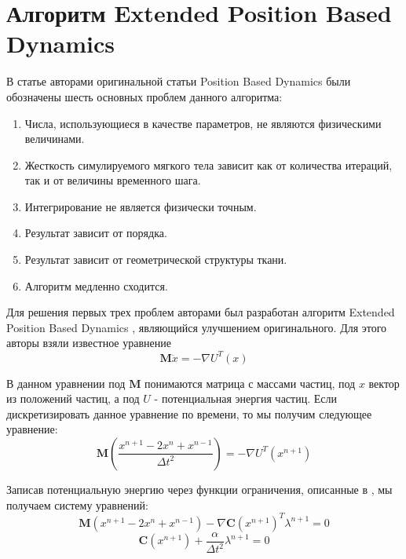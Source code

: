 \section{Алгоритм Extended Position Based Dynamics} \label{ch2:xpbd} %
	В статье \cite{muller2020detailed} авторами оригинальной статьи Position Based Dynamics были обозначены шесть основных проблем данного алгоритма:
	\begin{enumerate}[1.]
		\item Числа, использующиеся в качестве параметров, не являются физическими величинами.
		\item Жесткость симулируемого мягкого тела зависит как от количества итераций, так и от величины временного шага.
		\item Интегрирование не является физически точным.
		\item Результат зависит от порядка.
		\item Результат зависит от геометрической структуры ткани.
		\item Алгоритм медленно сходится.
	\end{enumerate}
	
	Для решения первых трех проблем авторами был разработан алгоритм Extended Position Based Dynamics \cite{xpbd}, являющийся улучшением оригинального. Для этого авторы взяли известное уравнение
	\begin{equation}
		\textbf{M}\ddot{x} = -\nabla U^T(x)
	\end{equation}
	
	В данном уравнении под $\textbf{M}$ понимаются матрица с массами частиц, под $x$ вектор из положений частиц, а под $U$ - потенциальная энергия частиц. Если дискретизировать данное уравнение по времени, то мы получим следующее уравнение:
	\begin{equation}
		\textbf{M}(\frac{x^{n+1} - 2x^n + x^{n-1}}{\Delta t^2}) = -\nabla U^T(x^{n+1})
	\end{equation}
	
	Записав потенциальную энергию через функции ограничения, описанные в \cite{servin2006interactive}, мы получаем систему уравнений:
	\begin{equation} \label{eq:xpbd_first}
		\textbf{M}(x^{n+1} - 2x^n + x^{n-1}) - \nabla \textbf{C}(x^{n+1})^T\lambda^{n+1} = 0
	\end{equation}
	\begin{equation} \label{eq:xpbd_second}
		\textbf{C}(x^{n+1}) + \frac{\alpha}{\Delta t^2}\lambda^{n+1} = 0		
	\end{equation}
	
